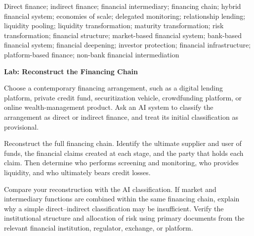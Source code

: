 

Direct finance; indirect finance; financial intermediary; financing chain; hybrid financial system; economies of scale; delegated monitoring; relationship lending; liquidity pooling; liquidity transformation; maturity transformation; risk transformation; financial structure; market-based financial system; bank-based financial system; financial deepening; investor protection; financial infrastructure; platform-based finance; non-bank financial intermediation



\textbf{Lab: Reconstruct the Financing Chain}

Choose a contemporary financing arrangement, such as a digital lending platform, private credit fund, securitization vehicle, crowdfunding platform, or online wealth-management product. Ask an AI system to classify the arrangement as direct or indirect finance, and treat its initial classification as provisional.

Reconstruct the full financing chain. Identify the ultimate supplier and user of funds, the financial claims created at each stage, and the party that holds each claim. Then determine who performs screening and monitoring, who provides liquidity, and who ultimately bears credit losses.

Compare your reconstruction with the AI classification. If market and intermediary functions are combined within the same financing chain, explain why a simple direct--indirect classification may be insufficient. Verify the institutional structure and allocation of risk using primary documents from the relevant financial institution, regulator, exchange, or platform.



